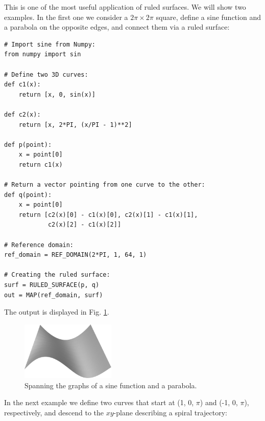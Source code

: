 This is one of the most useful application of ruled surfaces.
We will show two examples. In the first one we consider 
a $2\pi \times 2\pi$ square, define a sine function and 
a parabola on the opposite edges, and connect them via 
a ruled surface:\\

\begin{bbox}
\begin{verbatim}
# Import sine from Numpy:
from numpy import sin

# Define two 3D curves:
def c1(x):
    return [x, 0, sin(x)]

def c2(x):
    return [x, 2*PI, (x/PI - 1)**2]
  
def p(point):
    x = point[0]
    return c1(x)
  
# Return a vector pointing from one curve to the other:
def q(point):
    x = point[0]
    return [c2(x)[0] - c1(x)[0], c2(x)[1] - c1(x)[1], 
            c2(x)[2] - c1(x)[2]]
  
# Reference domain:
ref_domain = REF_DOMAIN(2*PI, 1, 64, 1)

# Creating the ruled surface:
surf = RULED_SURFACE(p, q)
out = MAP(ref_domain, surf)
\end{verbatim}
\end{bbox}
\vspace{6mm}

\noindent
The output is displayed in Fig. \ref{fig:curves-10}.
\newpage

\begin{figure}[!ht]
\begin{center}
\includegraphics[width=0.4\textwidth]{img/curves-10.png}
\end{center}
\vspace{-4mm}
\caption{Spanning the graphs of a sine function and a parabola.}
\label{fig:curves-10}
\end{figure}
\noindent
In the next example we define 
two curves that start at (1, 0, $\pi$) and (-1, 0, $\pi$), respectively,
and descend to the $xy$-plane describing a spiral trajectory:\\

